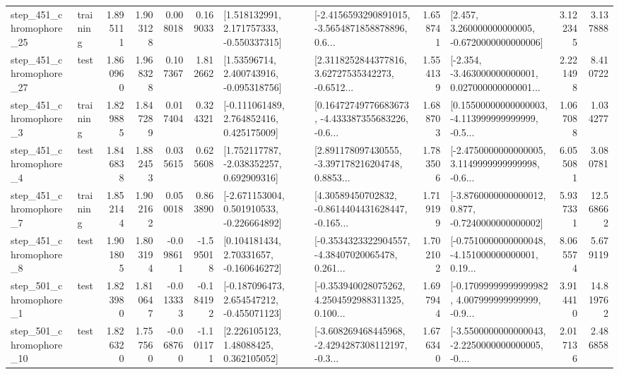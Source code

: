 \begin{tabular}{llrrrrllrlrr}
  step\_451\_chromophore\_25 &  training &      1.895111 &    1.903128 &      0.008018 &  0.169033 &    [1.518132991, 2.171757333, -0.550337315] &  [-2.4156593290891015, -3.5654871858878896, 0.6... &       1.658741 &    [2.457, 3.260000000000005, -0.6720000000000006] &            3.122345 &          3.137888 \\
  step\_451\_chromophore\_27 &      test &      1.860960 &    1.968328 &      0.107367 &  1.812662 &     [1.53596714, 2.400743916, -0.095318756] &  [2.3118252844377816, 3.62727535342273, -0.6512... &       1.554139 &  [-2.354, -3.463000000000001, 0.027000000000001... &            2.221498 &          8.410722 \\
   step\_451\_chromophore\_3 &  training &      1.829885 &    1.847289 &      0.017404 &  0.324321 &    [-0.111061489, 2.764852416, 0.425175009] &  [0.16472749776683673, -4.433387355683226, -0.6... &       1.688703 &  [0.15500000000000003, -4.113999999999999, -0.5... &            1.067088 &          1.034277 \\
   step\_451\_chromophore\_4 &      test &      1.846838 &    1.882453 &      0.035615 &  0.625608 &    [1.752117787, -2.038352257, 0.692909316] &  [2.891178097430555, -3.397178216204748, 0.8853... &       1.783506 &  [-2.4750000000000005, 3.1149999999999998, -0.6... &            6.055081 &          3.080781 \\
   step\_451\_chromophore\_7 &  training &      1.852144 &    1.902162 &      0.050018 &  0.863890 &   [-2.671153004, 0.501910533, -0.226664892] &  [4.30589450702832, -0.8614404431628447, -0.165... &       1.719199 &  [-3.8760000000000012, 0.877, -0.7240000000000002] &            5.937331 &         12.568662 \\
   step\_451\_chromophore\_8 &      test &      1.901805 &    1.803194 &     -0.098611 & -1.595018 &     [0.104181434, 2.70331657, -0.160646272] &  [-0.3534323322904557, -4.38407020065478, 0.261... &       1.702102 &  [-0.7510000000000048, -4.151000000000001, 0.19... &            8.065574 &          5.679119 \\
   step\_501\_chromophore\_1 &      test &      1.823980 &    1.810647 &     -0.013333 & -0.184192 &   [-0.187096473, 2.654547212, -0.455071123] &  [-0.353940028075262, 4.2504592988311325, 0.100... &       1.697944 &  [-0.17099999999999982, 4.007999999999999, -0.9... &            3.914410 &         14.819762 \\
  step\_501\_chromophore\_10 &      test &      1.826320 &    1.757560 &     -0.068760 & -1.101171 &      [2.226105123, 1.48088425, 0.362105052] &  [-3.608269468445968, -2.4294287308112197, -0.3... &       1.676340 &  [-3.5500000000000043, -2.2250000000000005, -0.... &            2.017136 &          2.486858 \\

\end{tabular}
